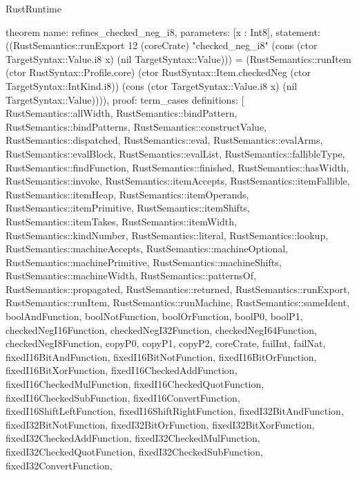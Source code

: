 \begin{lexlean}{RustRuntime}
\begin{semanticmodule}
theorem{
  name: refines_checked_neg_i8,
  parameters: [x : Int8],
  statement: ((RustSemantics::runExport 12 (coreCrate) "checked_neg_i8" (cons (ctor TargetSyntax::Value.i8 x) (nil TargetSyntax::Value))) = (RustSemantics::runItem (ctor RustSyntax::Profile.core) (ctor RustSyntax::Item.checkedNeg (ctor TargetSyntax::IntKind.i8)) (cons (ctor TargetSyntax::Value.i8 x) (nil TargetSyntax::Value)))),
  proof: term_cases{
    definitions: [
      RustSemantics::allWidth,
      RustSemantics::bindPattern,
      RustSemantics::bindPatterns,
      RustSemantics::constructValue,
      RustSemantics::dispatched,
      RustSemantics::eval,
      RustSemantics::evalArms,
      RustSemantics::evalBlock,
      RustSemantics::evalList,
      RustSemantics::fallibleType,
      RustSemantics::findFunction,
      RustSemantics::finished,
      RustSemantics::hasWidth,
      RustSemantics::invoke,
      RustSemantics::itemAccepts,
      RustSemantics::itemFallible,
      RustSemantics::itemHeap,
      RustSemantics::itemOperands,
      RustSemantics::itemPrimitive,
      RustSemantics::itemShifts,
      RustSemantics::itemTakes,
      RustSemantics::itemWidth,
      RustSemantics::kindNumber,
      RustSemantics::literal,
      RustSemantics::lookup,
      RustSemantics::machineAccepts,
      RustSemantics::machineOptional,
      RustSemantics::machinePrimitive,
      RustSemantics::machineShifts,
      RustSemantics::machineWidth,
      RustSemantics::patternsOf,
      RustSemantics::propagated,
      RustSemantics::returned,
      RustSemantics::runExport,
      RustSemantics::runItem,
      RustSemantics::runMachine,
      RustSemantics::sameIdent,
      boolAndFunction,
      boolNotFunction,
      boolOrFunction,
      boolP0,
      boolP1,
      checkedNegI16Function,
      checkedNegI32Function,
      checkedNegI64Function,
      checkedNegI8Function,
      copyP0,
      copyP1,
      copyP2,
      coreCrate,
      failInt,
      failNat,
      fixedI16BitAndFunction,
      fixedI16BitNotFunction,
      fixedI16BitOrFunction,
      fixedI16BitXorFunction,
      fixedI16CheckedAddFunction,
      fixedI16CheckedMulFunction,
      fixedI16CheckedQuotFunction,
      fixedI16CheckedSubFunction,
      fixedI16ConvertFunction,
      fixedI16ShiftLeftFunction,
      fixedI16ShiftRightFunction,
      fixedI32BitAndFunction,
      fixedI32BitNotFunction,
      fixedI32BitOrFunction,
      fixedI32BitXorFunction,
      fixedI32CheckedAddFunction,
      fixedI32CheckedMulFunction,
      fixedI32CheckedQuotFunction,
      fixedI32CheckedSubFunction,
      fixedI32ConvertFunction,
}}
\end{semanticmodule}
\end{lexlean}
